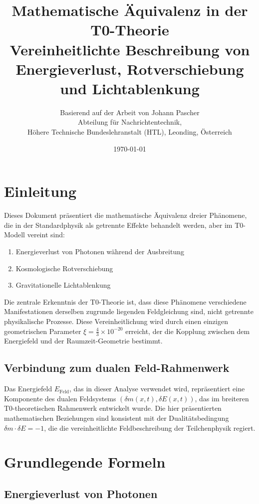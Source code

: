 \documentclass[12pt,a4paper]{article}
\title{\Huge\textbf{Mathematische \"Aquivalenz in der T0-Theorie}\\\Large Vereinheitlichte Beschreibung von Energieverlust, Rotverschiebung und Lichtablenkung}
\author{Basierend auf der Arbeit von Johann Pascher\\
	Abteilung f\"ur Nachrichtentechnik, \\H\"ohere Technische Bundeslehranstalt (HTL), Leonding, \"Osterreich}
\date{\today}
\newcommand{\efield}{E_{\text{Feld}}}
\theoremstyle{definition}
\begin{document}
	
	\maketitle
	\tableofcontents
	\thispagestyle{fancy}
	\newpage
	
	\section{Einleitung}
	
	Dieses Dokument pr\"asentiert die mathematische \"Aquivalenz dreier Ph\"anomene, die in der Standardphysik als getrennte Effekte behandelt werden, aber im T0-Modell vereint sind:
	
	\begin{enumerate}
		\item Energieverlust von Photonen w\"ahrend der Ausbreitung
		\item Kosmologische Rotverschiebung
		\item Gravitationelle Lichtablenkung
	\end{enumerate}
	
	Die zentrale Erkenntnis der T0-Theorie ist, dass diese Ph\"anomene verschiedene Manifestationen derselben zugrunde liegenden Feldgleichung sind, nicht getrennte physikalische Prozesse. Diese Vereinheitlichung wird durch einen einzigen geometrischen Parameter $\xi = \frac{4}{3} \times 10^{-20}$ erreicht, der die Kopplung zwischen dem Energiefeld und der Raumzeit-Geometrie bestimmt.
	
	\subsection{Verbindung zum dualen Feld-Rahmenwerk}
	
	Das Energiefeld $\efield$, das in dieser Analyse verwendet wird, repr\"asentiert eine Komponente des dualen Feldsystems $(\delta m(x,t), \delta E(x,t))$, das im breiteren T0-theoretischen Rahmenwerk entwickelt wurde. Die hier pr\"asentierten mathematischen Beziehungen sind konsistent mit der Dualit\"atsbedingung $\delta m \cdot \delta E = -1$, die die vereinheitlichte Feldbeschreibung der Teilchenphysik regiert.
	
	\section{Grundlegende Formeln}
	
	\subsection{Energieverlust von Photonen}
	
\end{document}
